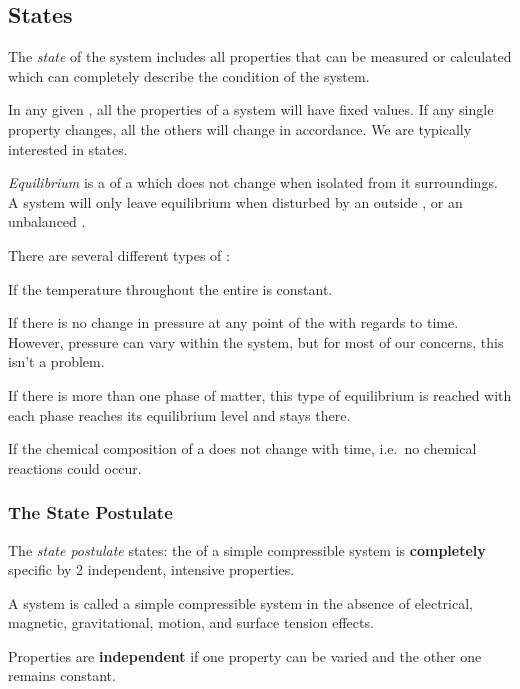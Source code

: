 \subsection{States}\label{subsec:States}
\begin{definition}[State]\label{def:State}
  The \emph{state} of the system includes all properties that can be measured or calculated which can completely describe the condition of the system.
\end{definition}

In any given , all the properties of a system will have fixed values.
If any single property changes, all the others will change in accordance.
We are typically interested in  states.

\begin{definition}[Equilibrium]\label{def:Equilibrium}
  \emph{Equilibrium} is a  of a  which does not change when isolated from it surroundings.
  A system will only leave equilibrium when disturbed by an outside , or an unbalanced .
\end{definition}

There are several different types of :
\begin{description}[noitemsep]
\item[Thermal Equilibrium] If the temperature throughout the entire  is constant.
\item[Mechanical Equilibrium] If there is no change in pressure at any point of the  with regards to time.
  However, pressure can vary within the system, but for most of our concerns, this isn't a problem.
\item[Phase Equilibrium] If there is more than one phase of matter, this type of equilibrium is reached with each phase reaches its equilibrium level and stays there.
\item[Chemical Equilibrium] If the chemical composition of a  does not change with time, i.e.\ no chemical reactions could occur.
\end{description}

\subsubsection{The State Postulate}\label{subsubsec:State_Postulate}
\begin{definition}\label{def:State_Postulate}
  The \emph{state postulate} states: the  of a simple compressible system is \textbf{completely} specific by 2 independent, intensive properties.

  \begin{remark}
    A system is called a simple compressible system in the absence of electrical, magnetic, gravitational, motion, and surface tension effects.
  \end{remark}
\end{definition}

Properties are \textbf{independent} if one property can be varied and the other one remains constant.

